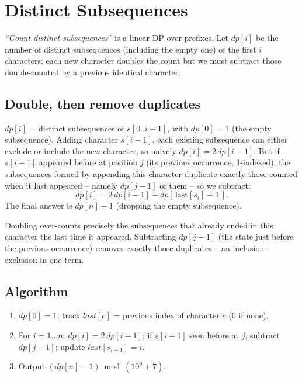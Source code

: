\section{Distinct Subsequences}
\label{sec:cses-distinct-subsequences}


\begin{patternbox}
\emph{``Count distinct subsequences''} is a linear DP over prefixes. Let
$\textit{dp}[i]$ be the number of distinct subsequences (including the
empty one) of the first $i$ characters; each new character doubles the
count but we must subtract those double-counted by a previous identical
character.
\end{patternbox}

\subsection*{Double, then remove duplicates}

$\textit{dp}[i]$ = distinct subsequences of $s[0..i-1]$, with
$\textit{dp}[0]=1$ (the empty subsequence). Adding character $s[i-1]$, each
existing subsequence can either exclude or include the new character, so
naively $\textit{dp}[i]=2\,\textit{dp}[i-1]$. But if $s[i-1]$ appeared
before at position $j$ (its previous occurrence, 1-indexed), the
subsequences formed by appending this character duplicate exactly those
counted when it last appeared -- namely $\textit{dp}[j-1]$ of them -- so we
subtract:
\[
  \textit{dp}[i]=2\,\textit{dp}[i-1]-\textit{dp}[\,\text{last}[s_i]-1\,].
\]
The final answer is $\textit{dp}[n]-1$ (dropping the empty subsequence).

\begin{ideabox}
Doubling over-counts precisely the subsequences that already ended in this
character the last time it appeared. Subtracting $\textit{dp}[j-1]$ (the
state just before the previous occurrence) removes exactly those
duplicates -- an inclusion--exclusion in one term.
\end{ideabox}

\subsection*{Algorithm}

\begin{enumerate}
  \item $\textit{dp}[0]=1$; track $\textit{last}[c]$ = previous index of
        character $c$ (0 if none).
  \item For $i=1\ldots n$: $\textit{dp}[i]=2\,\textit{dp}[i-1]$; if
        $s[i-1]$ seen before at $j$, subtract $\textit{dp}[j-1]$; update
        $\textit{last}[s_{i-1}]=i$.
  \item Output $(\textit{dp}[n]-1)\bmod(10^9+7)$.
\end{enumerate}

